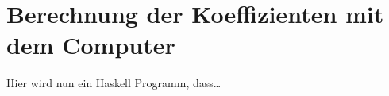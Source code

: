 \chapter{Berechnung der Koeffizienten mit dem Computer}
Hier wird nun ein Haskell Programm, dass\dots


